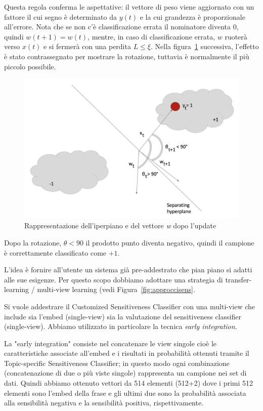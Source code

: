 Questa regola conferma le aspettative: il vettore di peso viene aggiornato con un fattore il cui segno è determinato da $y(t)$ e la cui grandezza è proporzionale all'errore. Nota che se non c'è classificazione errata il nominatore diventa $0$, quindi $w(t + 1) = w(t)$, mentre, in caso di classificazione errata, $w$ ruoterà verso $x(t)$ e si fermerà con una perdita $L \leq \xi$. Nella figura~\ref{fig:PAII2} successiva, l'effetto è stato contrassegnato per mostrare la rotazione, tuttavia è normalmente il più piccolo possibile.

\begin{figure}[h]
    \centering
    \includegraphics[scale=0.5]{Figure/PAII2.png}
    \caption{Rappresentazione dell'iperpiano e del vettore \textit{w} dopo l'update}
    \label{fig:PAII2}
\end{figure}
\FloatBarrier  


Dopo la rotazione, $\theta <90$ il prodotto punto diventa negativo, quindi il campione è correttamente classificato come $+1$.

L'idea è fornire all'utente un sistema già pre-addestrato che pian piano si adatti alle sue esigenze. Per questo scopo dobbiamo adottare una strategia di transfer-learning / multi-view learning\cite{transfer-learning} (vedi Figura~\ref{fig:approccisens}.

Si vuole addestrare il Customized Sensitiveness Classifier con una multi-view che include sia l'embed (single-view) sia la valutazione del sensitiveness classifier (single-view). Abbiamo utilizzato in particolare la tecnica \textit{early integration}. 

La "early integration" consiste nel concatenare le view singole cioè le caratteristiche associate all'embed e i risultati in probabilità ottenuti tramite il Topic-specific Sensitiveness Classifier; in questo modo ogni combinazione (concatenazione di due o più viste singole) rappresenta un campione nei set di dati. Quindi abbiamo ottenuto vettori da 514 elementi (512+2) dove i primi 512 elementi sono l'embed della frase e gli ultimi due sono la probabilità associata alla sensibilità negativa e la sensibilità positiva, rispettivamente.

